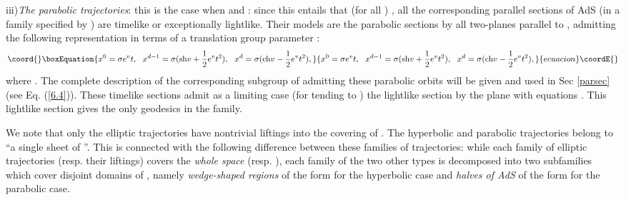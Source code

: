 \documentclass[a4paper,a4paper]{article}
\def\wt{\widetilde}
\begin{document}
\vskip 0.2cm
iii){\sl  The parabolic trajectories}:
this is the case when \coordHE{} and \coordHE{}: since
this entails that (for all \myHighlight{$\alpha,\beta$}\coordHE{})
\coordHE{}, all the corresponding
parallel sections of AdS (in a family specified by \coordHE{})
are timelike or exceptionally lightlike.
Their models are the parabolic sections by all two-planes
parallel to \coordHE{}, admitting the following
representation in terms of a translation group parameter \coordHE{}:
\begin{equation}\coord{}\boxEquation{
x^0 = \sigma e^v  t,\ \
x^{d-1} = \sigma ({\rm sh} v + {1\over 2}e^v t^2),\ \
x^d = \sigma ({\rm ch} v - {1\over 2}e^v t^2),
\label{parabol}
}{
x^0 = \sigma e^v  t,\ \
x^{d-1} = \sigma ({\rm sh} v + {1\over 2}e^v t^2),\ \
x^d = \sigma ({\rm ch} v - {1\over 2}e^v t^2),
}{ecuacion}\coordE{}\end{equation}
where \coordHE{}.
The complete description of the corresponding subgroup of \coordHE{}
admitting these parabolic orbits
will be given and used in Sec \ref{parsec} (see Eq. (\ref{6.4})).
These timelike sections admit as a limiting case (for
\myHighlight{$v$}\coordHE{} tending to \myHighlight{$-\infty$}\coordHE{}) the lightlike section by the plane
with equations \coordHE{}.
This lightlike section gives the only geodesics in the family.

\vskip 0.2cm
We note that only the elliptic trajectories have nontrivial
liftings into the covering of \myHighlight{$X_d$}\coordHE{}.
The hyperbolic and parabolic
trajectories belong to ``a single sheet of \myHighlight{$\wt X_d$}\coordHE{}''.
This is connected with the following difference between these families
of trajectories:
while each family of elliptic trajectories
(resp. their liftings) covers the
{\sl whole space} \myHighlight{$X_d$}\coordHE{} (resp. \myHighlight{$\wt X_d$}\coordHE{}),
each family of the two other types is decomposed into
two subfamilies which cover disjoint domains of \coordHE{},
namely {\sl wedge-shaped regions} of the form \coordHE{} for the hyperbolic case and {\sl halves of  AdS}
of the form
\coordHE{} for the
parabolic case.
\end{document}
